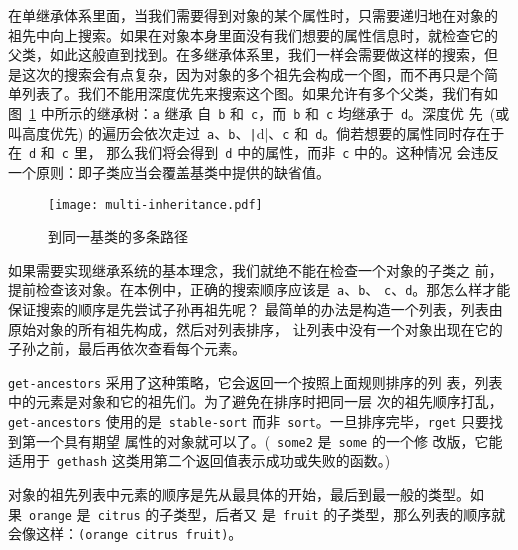 在单继承体系里面，当我们需要得到对象的某个属性时，只需要递归地在对象的
祖先中向上搜索。如果在对象本身里面没有我们想要的属性信息时，就检查它的
父类，如此这般直到找到。在多继承体系里，我们一样会需要做这样的搜索，但
是这次的搜索会有点复杂，因为对象的多个祖先会构成一个图，而不再只是个简
单列表了。我们不能用深度优先来搜索这个图。如果允许有多个父类，我们有如
图~\ref{fig:multiple_paths_to_a_superclass} 中所示的继承树：\texttt{a} 继承
自~\texttt{b} 和~\texttt{c}，而~\texttt{b} 和~\texttt{c} 均继承于~\texttt{d}。深度优
先~(或叫高度优先) 的遍历会依次走过~\texttt{a}、\texttt{b}、\texttt|d|、\texttt{c}
和~\texttt{d}。倘若想要的属性同时存在于在~\texttt{d} 和~\texttt{c} 里，
那么我们将会得到~\texttt{d} 中的属性，而非~\texttt{c} 中的。这种情况
会违反一个原则：即子类应当会覆盖基类中提供的缺省值。
\begin{figure}
\begin{center}
\texttt{[image: multi-inheritance.pdf]}
\end{center}
\caption{\label{fig:multiple_paths_to_a_superclass}到同一基类的多条路径}
\end{figure}

如果需要实现继承系统的基本理念，我们就绝不能在检查一个对象的子类之
前，提前检查该对象。在本例中，正确的搜索顺序应该是~\texttt{a}、\texttt{b}、
\texttt{c}、\texttt{d}。那怎么样才能保证搜索的顺序是先尝试子孙再祖先呢？
最简单的办法是构造一个列表，列表由原始对象的所有祖先构成，然后对列表排序，
让列表中没有一个对象出现在它的子孙之前，最后再依次查看每个元素。

\texttt{get-ancestors} 采用了这种策略，它会返回一个按照上面规则排序的列
表，列表中的元素是对象和它的祖先们。为了避免在排序时把同一层
次的祖先顺序打乱，\texttt{get-ancestors} 使用的是~\texttt{stable-sort}
而非~\texttt{sort}。一旦排序完毕，\texttt{rget} 只要找到第一个具有期望
属性的对象就可以了。(\utility~\texttt{some2} 是~\texttt{some} 的一个修
改版，它能适用于~\texttt{gethash} 这类用第二个返回值表示成功或失败的函数。)

对象的祖先列表中元素的顺序是先从最具体的开始，最后到最一般的类型。如
果~\texttt{orange} 是~\texttt{citrus} 的子类型，后者又
是~\texttt{fruit} 的子类型，那么列表的顺序就会像这样：\texttt{(orange
  citrus fruit)}。


